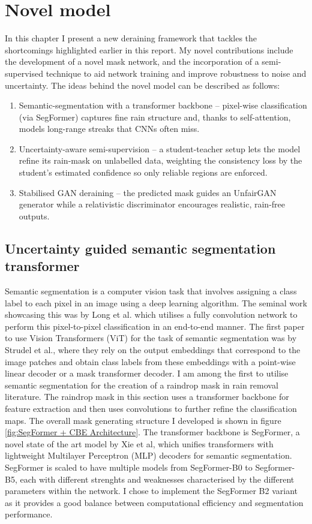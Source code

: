 \documentclass[11pt]{ociamthesis}  %
\begin{document}
\chapter{Novel model}

In this chapter I present a new deraining framework that tackles the shortcomings highlighted earlier in this report. My novel contributions include the development of a novel mask network, and the incorporation of a semi-supervised technique to aid network training and improve robustness to noise and uncertainty. The ideas behind the novel model can be described as follows:  
\begin{enumerate}
    \item Semantic-segmentation with a transformer backbone – pixel-wise classification (via SegFormer) captures fine rain structure and, thanks to self-attention, models long-range streaks that CNNs often miss.
    \item Uncertainty-aware semi-supervision – a student-teacher setup lets the model refine its rain-mask on unlabelled data, weighting the consistency loss by the student’s estimated confidence so only reliable regions are enforced.
    \item Stabilised GAN deraining – the predicted mask guides an UnfairGAN generator while a relativistic discriminator encourages realistic, rain-free outputs. 
\end{enumerate}

\section{Uncertainty guided semantic segmentation transformer}
Semantic segmentation is a computer vision task that involves assigning a class label to each pixel in an image using a deep learning algorithm. The seminal work showcasing this was by Long et al.\cite{long2015fullyconvolutionalnetworkssemantic} which utilises a fully convolution network to perform this pixel-to-pixel classification in an end-to-end manner. The first paper to use Vision Transformers (ViT) for the task of semantic segmentation was by Strudel et al.\cite{strudel2021segmentertransformersemanticsegmentation}, where they rely on the output embeddings that correspond to the image patches and obtain class labels from these embeddings with a point-wise linear decoder or a mask transformer decoder. I am among the first to utilise semantic segmentation for the creation of a raindrop mask in rain removal literature. The raindrop mask in this section uses a transformer backbone for feature extraction and then uses convolutions to further refine the classification maps. The overall mask generating structure I developed is shown in figure \ref{fig:SegFormer + CBE Architecture}. The transformer backbone is SegFormer, a novel state of the art model by Xie et al\cite{SegFormer}, which unifies transformers with lightweight Multilayer Perceptron (MLP) decoders for semantic segmentation. SegFormer is scaled to have multiple models from SegFormer-B0 to Segformer-B5, each with different strenghts and weaknesses characterised by the different parameters within the network. I chose to implement the SegFormer B2 variant as it provides a good balance between computational efficiency and segmentation performance.
\end{document}

